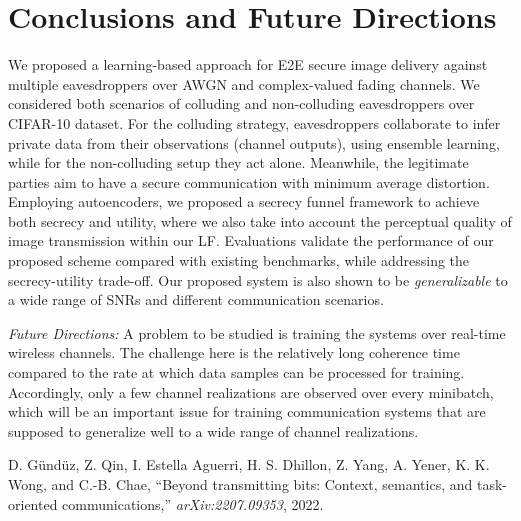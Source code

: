 \documentclass[conference]{IEEEtran}
\begin{document}
{{	

	

	
	\vspace{-0.5mm}
	\section{Conclusions and Future Directions}\label{sec:Conclusion}
	\vspace{-1.0mm}  
	We proposed  a learning-based approach for E2E secure image delivery against multiple eavesdroppers  over AWGN and  complex-valued fading   channels.  
	{We considered both scenarios of {colluding} and {non-colluding} eavesdroppers
		over CIFAR-10 dataset.}  
	For the colluding  strategy, eavesdroppers collaborate  to infer private  data from their observations (channel outputs),  using ensemble learning, while for   the  {non-colluding} setup  they act alone.  
	Meanwhile, 	the legitimate parties aim to have a secure  communication with minimum average  distortion. 
	Employing  autoencoders, we proposed 
	a  secrecy funnel framework to  achieve  both secrecy and utility, where   we also take  into account the perceptual  quality of image transmission within our LF. 
	Evaluations  validate the performance  of our proposed scheme compared with existing benchmarks, while addressing the secrecy-utility trade-off.   
	Our proposed system is also shown to be \emph{generalizable} to a wide range of 
	SNRs and  different communication scenarios. 
	
	\emph{Future Directions:}  
	A problem to be studied is  
	training the systems over real-time wireless  channels. The challenge here  is the
	relatively long coherence time compared to the rate at which
	data samples can be processed for training.  Accordingly, 
	only a few channel realizations are observed  over every   minibatch,
	which will be an important issue for training communication systems that are supposed to generalize well to a wide range of channel realizations.  
	
	
	\vspace{0mm}
	\begin{thebibliography}{10}
		\vspace{-1mm}
	D. Gündüz, Z. Qin, I. Estella Aguerri, H. S. Dhillon, Z. Yang, A. Yener, K. K. Wong, and C.-B. Chae, ``Beyond transmitting bits: Context, semantics, and task-oriented communications,'' \emph{arXiv:2207.09353}, 2022. 
		

\end{thebibliography}}}
\end{document}
